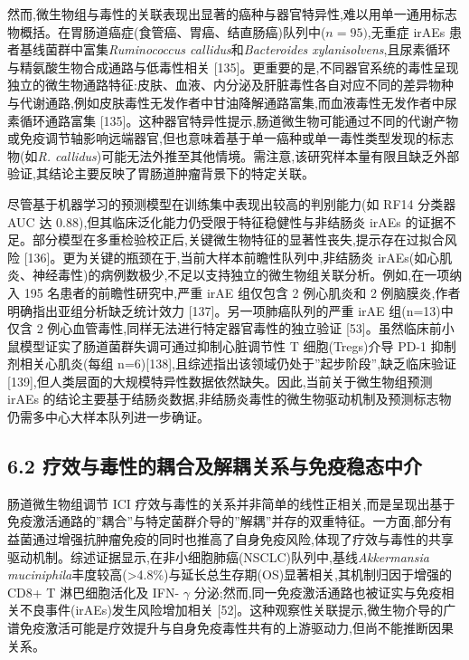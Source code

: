 \documentclass[11pt]{article}
\begin{document}
然而,微生物组与毒性的关联表现出显著的癌种与器官特异性,难以用单一通用标志物概括。在胃肠道癌症(食管癌、胃癌、结直肠癌)队列中(\(n=95)\),无重症 irAEs 患者基线菌群中富集\emph{Ruminococcus callidus}和\emph{Bacteroides xylanisolvens},且尿素循环与精氨酸生物合成通路与低毒性相关 {[}135{]}。更重要的是,不同器官系统的毒性呈现独立的微生物通路特征:皮肤、血液、内分泌及肝脏毒性各自对应不同的差异物种与代谢通路,例如皮肤毒性无发作者中甘油降解通路富集,而血液毒性无发作者中尿素循环通路富集 {[}135{]}。这种器官特异性提示,肠道微生物可能通过不同的代谢产物或免疫调节轴影响远端器官,但也意味着基于单一癌种或单一毒性类型发现的标志物(如\emph{R. callidus})可能无法外推至其他情境。需注意,该研究样本量有限且缺乏外部验证,其结论主要反映了胃肠道肿瘤背景下的特定关联。

尽管基于机器学习的预测模型在训练集中表现出较高的判别能力(如 RF14 分类器 AUC 达 0.88),但其临床泛化能力仍受限于特征稳健性与非结肠炎 irAEs 的证据不足。部分模型在多重检验校正后,关键微生物特征的显著性丧失,提示存在过拟合风险 {[}136{]}。更为关键的瓶颈在于,当前大样本前瞻性队列中,非结肠炎 irAEs(如心肌炎、神经毒性)的病例数极少,不足以支持独立的微生物组关联分析。例如,在一项纳入 195 名患者的前瞻性研究中,严重 irAE 组仅包含 2 例心肌炎和 2 例脑膜炎,作者明确指出亚组分析缺乏统计效力 {[}137{]}。另一项肺癌队列的严重 irAE 组(n=13)中仅含 2 例心血管毒性,同样无法进行特定器官毒性的独立验证 {[}53{]}。虽然临床前小鼠模型证实了肠道菌群失调可通过抑制心脏调节性 T 细胞(Tregs)介导 PD-1 抑制剂相关心肌炎(每组 n=6){[}138{]},且综述指出该领域仍处于''起步阶段'',缺乏临床验证 {[}139{]},但人类层面的大规模特异性数据依然缺失。因此,当前关于微生物组预测 irAEs 的结论主要基于结肠炎数据,非结肠炎毒性的微生物驱动机制及预测标志物仍需多中心大样本队列进一步确证。

\subsection{6.2 疗效与毒性的耦合及解耦关系与免疫稳态中介}\label{ux7597ux6548ux4e0eux6bd2ux6027ux7684ux8026ux5408ux53caux89e3ux8026ux5173ux7cfbux4e0eux514dux75abux7a33ux6001ux4e2dux4ecb}

肠道微生物组调节 ICI 疗效与毒性的关系并非简单的线性正相关,而是呈现出基于免疫激活通路的''耦合''与特定菌群介导的''解耦''并存的双重特征。一方面,部分有益菌通过增强抗肿瘤免疫的同时也推高了自身免疫风险,体现了疗效与毒性的共享驱动机制。综述证据显示,在非小细胞肺癌(NSCLC)队列中,基线\emph{Akkermansia muciniphila}丰度较高(\textgreater4.8\%)与延长总生存期(OS)显著相关,其机制归因于增强的 CD8+ T 淋巴细胞活化及 IFN- \(\gamma\) 分泌;然而,同一免疫激活通路也被证实与免疫相关不良事件(irAEs)发生风险增加相关 {[}52{]}。这种观察性关联提示,微生物介导的广谱免疫激活可能是疗效提升与自身免疫毒性共有的上游驱动力,但尚不能推断因果关系。
\end{document}
